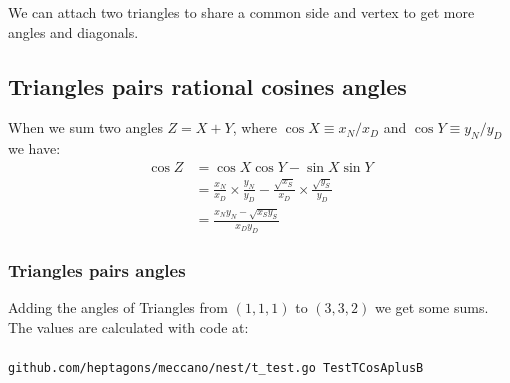 \documentclass[11pt]{article}
\begin{document}
We can attach two triangles to share a common side and vertex to get more angles and diagonals.

\subsection{Triangles pairs rational cosines angles}
When we sum two angles $Z = X+Y$, where $\cos{X} \equiv x_N / x_D$ and $\cos{Y} \equiv y_N / y_D$ we have:
\begin{align}
\cos{Z} &= \cos{X}\cos{Y} - \sin{X}\sin{Y}\\
 &= \frac{x_N}{x_D} \times \frac{y_N}{y_D} - \frac{\sqrt{x_S}}{x_D} \times \frac{\sqrt{y_S}}{y_D}\\
 &= \frac{x_Ny_N - \sqrt{x_Sy_S}}{x_Dy_D}
\end{align}

\subsubsection{Triangles pairs angles}

Adding the angles of Triangles from $(1,1,1)$ to $(3,3,2)$ we get some sums. The values are calculated with code at:
\\\\
\texttt{github.com/heptagons/meccano/nest/t\_test.go TestTCosAplusB}
\end{document}
